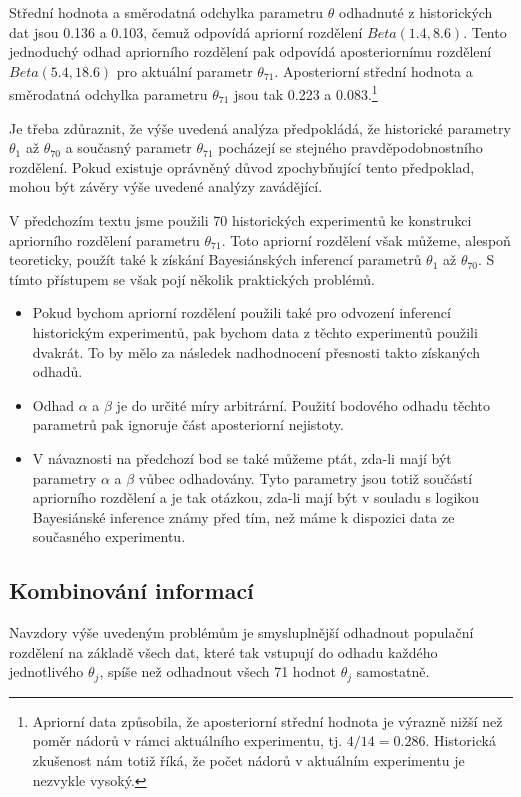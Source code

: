 Střední hodnota a směrodatná odchylka parametru $\theta$ odhadnuté z historických dat jsou 0.136 a 0.103, čemuž odpovídá apriorní rozdělení $\textit{Beta}(1.4, 8.6)$. Tento jednoduchý odhad apriorního rozdělení pak odpovídá aposteriornímu rozdělení $\textit{Beta}(5.4, 18.6)$ pro aktuální parametr $\theta_{71}$. Aposteriorní střední hodnota a směrodatná odchylka parametru $\theta_{71}$ jsou tak 0.223 a 0.083.\footnote{Apriorní data způsobila, že aposteriorní střední hodnota je výrazně nižší než poměr nádorů v rámci aktuálního experimentu, tj. $4 / 14 = 0.286$. Historická zkušenost nám totiž říká, že počet nádorů v aktuálním experimentu je nezvykle vysoký.}

Je třeba zdůraznit, že výše uvedená analýza předpokládá, že historické parametry $\theta_1$ až $\theta_{70}$ a současný parametr $\theta_{71}$ pocházejí se stejného pravděpodobnostního rozdělení. Pokud existuje oprávněný důvod zpochybňující tento předpoklad, mohou být závěry výše uvedené analýzy zavádějící.

V předchozím textu jsme použili 70 historických experimentů ke konstrukci apriorního rozdělení parametru $\theta_{71}$. Toto apriorní rozdělení však můžeme, alespoň teoreticky, použít také k získání Bayesiánských inferencí parametrů $\theta_1$ až $\theta_{70}$. S tímto přístupem se však pojí několik praktických problémů.
\begin{itemize}
\item Pokud bychom apriorní rozdělení použili také pro odvození inferencí historickým experimentů, pak bychom data z těchto experimentů použili dvakrát. To by mělo za následek nadhodnocení přesnosti takto získaných odhadů.
\item Odhad $\alpha$ a $\beta$ je do určité míry arbitrární. Použití bodového odhadu těchto parametrů pak ignoruje část aposteriorní nejistoty.
\item V návaznosti na předchozí bod se také můžeme ptát, zda-li mají být parametry $\alpha$ a $\beta$ vůbec odhadovány. Tyto parametry jsou totiž součástí apriorního rozdělení a je tak otázkou, zda-li mají být v souladu s logikou Bayesiánské inference známy před tím, než máme k dispozici data ze současného experimentu.
\end{itemize}

\subsection{Kombinování informací}

Navzdory výše uvedeným problémům je smysluplnější odhadnout populační rozdělení na základě všech dat, které tak vstupují do odhadu každého jednotlivého $\theta_j$, spíše než odhadnout všech 71 hodnot $\theta_j$ samostatně.

